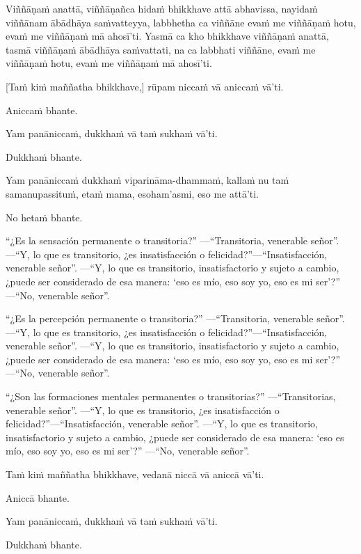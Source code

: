 Viññāṇaṁ anattā, viññāṇañca hidaṁ bhikkhave attā abhavissa, nayidaṁ viññānam
ābādhāya saṁvatteyya, labbhetha ca viññāne evaṁ me viññāṇaṁ hotu, evaṁ me
viññāṇaṁ mā ahosī'ti. Yasmā ca kho bhikkhave viññāṇaṁ anattā, tasmā viññāṇaṁ
ābādhāya saṁvattati, na ca labbhati viññāne, evaṁ me viññāṇaṁ hotu, evaṁ me
viññāṇaṁ mā ahosī'ti.

[Taṁ kiṁ maññatha bhikkhave,] rūpam niccaṁ vā aniccaṁ vā'ti.

Aniccaṁ bhante.

Yam panāniccaṁ, dukkhaṁ vā taṁ sukhaṁ vā'ti.

Dukkhaṁ bhante.

Yam panāniccaṁ dukkhaṁ viparināma-dhammaṁ, kallaṁ nu taṁ samanupassituṁ,
etaṁ mama, esoham'asmi, eso me attā'ti.

No hetaṁ bhante.

\clearpage

\englishText
\markboth{\englishTitle}{\rightmark}
“¿Es la sensación permanente o transitoria?”
—“Transitoria, venerable señor”.
—“Y, lo que es transitorio, ¿es insatisfacción o felicidad?”—“Insatisfacción, venerable señor”.
—“Y, lo que es transitorio, insatisfactorio y sujeto a cambio, ¿puede ser considerado de esa manera: ‘eso es mío, eso soy yo, eso es mi ser’?”
—“No, venerable señor”.

“¿Es la percepción permanente o transitoria?”
—“Transitoria, venerable señor”.
—“Y, lo que es transitorio, ¿es insatisfacción o felicidad?”—“Insatisfacción, venerable señor”.
—“Y, lo que es transitorio, insatisfactorio y sujeto a cambio, ¿puede ser considerado de esa manera: ‘eso es mío, eso soy yo, eso es mi ser’?”
—“No, venerable señor”.

“¿Son las formaciones mentales permanentes o transitorias?”
—“Transitorias, venerable señor”.
—“Y, lo que es transitorio, ¿es insatisfacción o felicidad?”—“Insatisfacción, venerable señor”.
—“Y, lo que es transitorio, insatisfactorio y sujeto a cambio, ¿puede ser considerado de esa manera: ‘eso es mío, eso soy yo, eso es mi ser’?”
—“No, venerable señor”.



\clearpage

\paliText
\markboth{\paliTitle}{\rightmark}

Taṁ kiṁ maññatha bhikkhave, vedanā niccā vā aniccā vā'ti.

Aniccā bhante.

Yam panāniccaṁ, dukkhaṁ vā taṁ sukhaṁ vā'ti.

Dukkhaṁ bhante.

